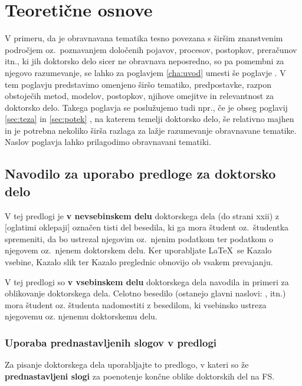 \chapter{Teoretične osnove}\label{cha:teoreticne_osnove}


V primeru, da je obravnavana tematika tesno povezana s širšim znanstvenim področjem oz.\ poznavanjem določenih pojavov, procesov, postopkov, preračunov itn., ki jih doktorsko delo sicer ne obravnava neposredno, so pa pomembni za njegovo razumevanje, se lahko za poglavjem \ref{cha:uvod}  umesti še poglavje . V tem poglavju predstavimo omenjeno širšo tematiko, predpostavke, razpon obstoječih metod, modelov, postopkov, njihove omejitve in relevantnost za doktorsko delo. Takega poglavja se poslužujemo tudi npr., če je obseg poglavij \ref{sec:teza}  in \ref{sec:potek} , na katerem temelji doktorsko delo, še relativno majhen in je potrebna nekoliko širša razlaga za lažje razumevanje obravnavane tematike. Naslov poglavja lahko prilagodimo obravnavani tematiki.
\section{Navodilo za uporabo predloge za doktorsko delo}\label{sec:uporaba_predloge}
V tej predlogi je \textbf{v nevsebinskem delu} doktorskega dela (do strani xxii) z [oglatimi oklepaji] označen tisti del besedila, ki ga mora študent oz.\ študentka spremeniti, da bo ustrezal njegovim oz.\ njenim podatkom ter podatkom o njegovem oz.\ njenem doktorskem delu. Ker uporabljate \LaTeX~se Kazalo vsebine, Kazalo slik ter Kazalo preglednic obnovijo ob vsakem prevajanju.

V tej predlogi so \textbf{v vsebinskem delu} doktorskega dela navodila in primeri za oblikovanje doktorskega dela. Celotno besedilo (ostanejo glavni naslovi: ,  itn.) mora študent oz. študenta nadomestiti z besedilom, ki vsebinsko ustreza njegovemu oz. njenemu doktorskemu delu.

\subsection{Uporaba prednastavljenih slogov v predlogi}\label{sec:prednastavitve}
Za pisanje doktorskega dela uporabljajte to predlogo, v kateri so že \textbf{prednastavljeni slogi} za poenotenje končne oblike doktorskih del na FS.

